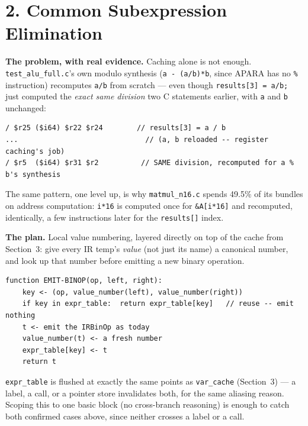 \documentclass[11pt,a4paper]{article}
\begin{document}
\section{2. Common Subexpression Elimination}

\textbf{The problem, with real evidence.} Caching alone is not enough.
\texttt{test\_alu\_full.c}'s own modulo synthesis (\texttt{a - (a/b)*b}, since APARA has no
\texttt{\%} instruction) recomputes \texttt{a/b} from scratch --- even though
\texttt{results[3] = a/b;} just computed the \emph{exact same division} two C statements
earlier, with \texttt{a} and \texttt{b} unchanged:
\begin{lstlisting}[caption={Confirmed in fresh mcode: \texttt{a/b} computed twice}]
/ $r25 ($i64) $r22 $r24        // results[3] = a / b
...                              // (a, b reloaded -- register caching's job)
/ $r5  ($i64) $r31 $r2          // SAME division, recomputed for a % b's synthesis
\end{lstlisting}
The same pattern, one level up, is why \texttt{matmul\_n16.c} spends 49.5\% of its
bundles on address computation: \texttt{i*16} is computed once for \texttt{\&A[i*16]} and
recomputed, identically, a few instructions later for the \texttt{results[]} index.

\textbf{The plan.} Local value numbering, layered directly on top of the cache from
Section~3: give every IR temp's \emph{value} (not just its name) a canonical number, and
look up that number before emitting a new binary operation.
\begin{lstlisting}[caption={CSE via local value numbering --- the rule, not yet implemented}]
function EMIT-BINOP(op, left, right):
    key <- (op, value_number(left), value_number(right))
    if key in expr_table:  return expr_table[key]   // reuse -- emit nothing
    t <- emit the IRBinOp as today
    value_number(t) <- a fresh number
    expr_table[key] <- t
    return t
\end{lstlisting}
\texttt{expr\_table} is flushed at exactly the same points as \texttt{var\_cache}
(Section~3) --- a label, a call, or a pointer store invalidates both, for the same
aliasing reason. Scoping this to one basic block (no cross-branch reasoning) is enough to
catch both confirmed cases above, since neither crosses a label or a call.

\end{document}
